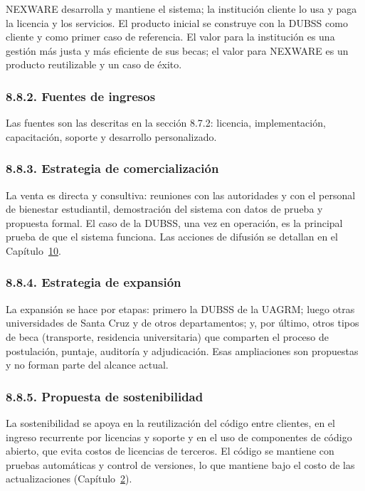 NEXWARE desarrolla y mantiene el sistema; la institución cliente lo usa y paga la licencia y los servicios. El producto inicial se construye con la DUBSS como cliente y como primer caso de referencia. El valor para la institución es una gestión más justa y más eficiente de sus becas; el valor para NEXWARE es un producto reutilizable y un caso de éxito.

\subsubsection{8.8.2. Fuentes de ingresos}

Las fuentes son las descritas en la sección 8.7.2: licencia, implementación, capacitación, soporte y desarrollo personalizado.

\subsubsection{8.8.3. Estrategia de comercialización}

La venta es directa y consultiva: reuniones con las autoridades y con el personal de bienestar estudiantil, demostración del sistema con datos de prueba y propuesta formal. El caso de la DUBSS, una vez en operación, es la principal prueba de que el sistema funciona. Las acciones de difusión se detallan en el Capítulo~\hyperref[cap:marketing]{10}.

\subsubsection{8.8.4. Estrategia de expansión}

La expansión se hace por etapas: primero la DUBSS de la UAGRM; luego otras universidades de Santa Cruz y de otros departamentos; y, por último, otros tipos de beca (transporte, residencia universitaria) que comparten el proceso de postulación, puntaje, auditoría y adjudicación. Esas ampliaciones son propuestas y no forman parte del alcance actual.

\subsubsection{8.8.5. Propuesta de sostenibilidad}

La sostenibilidad se apoya en la reutilización del código entre clientes, en el ingreso recurrente por licencias y soporte y en el uso de componentes de código abierto, que evita costos de licencias de terceros. El código se mantiene con pruebas automáticas y control de versiones, lo que mantiene bajo el costo de las actualizaciones (Capítulo~\hyperref[cap:sqap]{2}).

